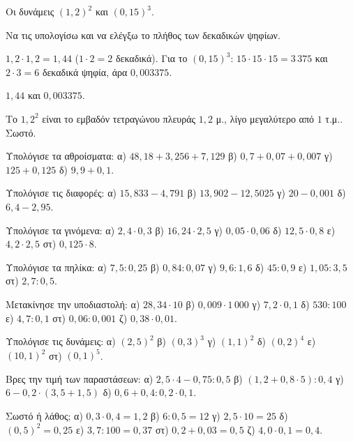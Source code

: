 \tixero Οι δυνάμεις $(1{,}2)^2$ και $(0{,}15)^3$.\par
\tithelo Να τις υπολογίσω και να ελέγξω το πλήθος των δεκαδικών ψηφίων.\par
\possindeo $1{,}2\cdot1{,}2=1{,}44$ ($1\cdot2=2$ δεκαδικά). Για το $(0{,}15)^3$: $15\cdot15\cdot15=3\,375$ και $2\cdot3=6$ δεκαδικά ψηφία, άρα $0{,}003375$.\par
\apantisi $1{,}44$ και $0{,}003375$.\par
\elegxos Το $1{,}2^2$ είναι το εμβαδόν τετραγώνου πλευράς $1{,}2$ μ., λίγο μεγαλύτερο από $1$ τ.μ.. Σωστό.



\ex Υπολόγισε τα αθροίσματα: α) $48{,}18+3{,}256+7{,}129$ \quad β) $0{,}7+0{,}07+0{,}007$ \quad γ) $125+0{,}125$ \quad δ) $9{,}9+0{,}1$.

\ex Υπολόγισε τις διαφορές: α) $15{,}833-4{,}791$ \quad β) $13{,}902-12{,}5025$ \quad γ) $20-0{,}001$ \quad δ) $6{,}4-2{,}95$.

\ex Υπολόγισε τα γινόμενα: α) $2{,}4\cdot0{,}3$ \quad β) $16{,}24\cdot2{,}5$ \quad γ) $0{,}05\cdot0{,}06$ \quad δ) $12{,}5\cdot0{,}8$ \quad ε) $4{,}2\cdot2{,}5$ \quad στ) $0{,}125\cdot8$.

\ex Υπολόγισε τα πηλίκα: α) $7{,}5:0{,}25$ \quad β) $0{,}84:0{,}07$ \quad γ) $9{,}6:1{,}6$ \quad δ) $45:0{,}9$ \quad ε) $1{,}05:3{,}5$ \quad στ) $2{,}7:0{,}5$.

\ex Μετακίνησε την υποδιαστολή: α) $28{,}34\cdot10$ \quad β) $0{,}009\cdot1\,000$ \quad γ) $7{,}2\cdot0{,}1$ \quad δ) $530:100$ \quad ε) $4{,}7:0{,}1$ \quad στ) $0{,}06:0{,}001$ \quad ζ) $0{,}38\cdot0{,}01$.

\ex Υπολόγισε τις δυνάμεις: α) $(2{,}5)^2$ \quad β) $(0{,}3)^3$ \quad γ) $(1{,}1)^2$ \quad δ) $(0{,}2)^4$ \quad ε) $(10{,}1)^2$ \quad στ) $(0{,}1)^5$.

\ex Βρες την τιμή των παραστάσεων: α) $2{,}5\cdot4-0{,}75:0{,}5$ \quad β) $(1{,}2+0{,}8\cdot5):0{,}4$ \quad γ) $6-0{,}2\cdot(3{,}5+1{,}5)$ \quad δ) $0{,}6+0{,}4:0{,}2\cdot0{,}1$.

\ex Σωστό ή λάθος; α) $0{,}3\cdot0{,}4=1{,}2$ \quad β) $6:0{,}5=12$ \quad γ) $2{,}5\cdot10=25$ \quad δ) $(0{,}5)^2=0{,}25$ \quad ε) $3{,}7:100=0{,}37$ \quad στ) $0{,}2+0{,}03=0{,}5$ \quad ζ) $4{,}0\cdot0{,}1=0{,}4$.



